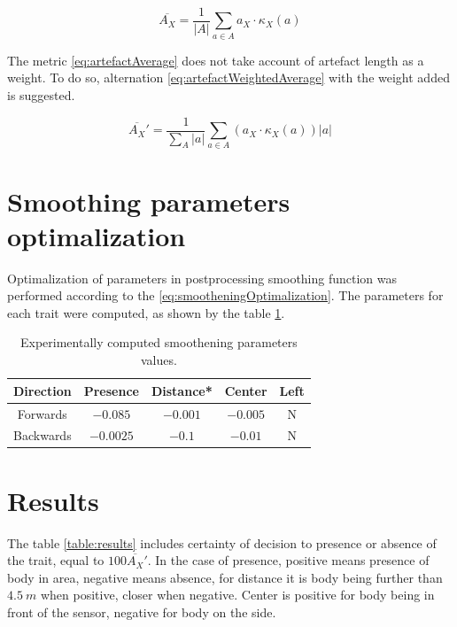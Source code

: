 \begin{equation}
\overline{A_{X}} = \frac{1}{|A|} \sum_{a\in A} a_{X} \cdot \kappa_{X}(a)
\label{eq:artefactAverage}
\end{equation}

The metric \ref{eq:artefactAverage} does not take account of artefact length
as a weight. To do so, alternation \ref{eq:artefactWeightedAverage} with the
weight added is suggested.

\begin{equation}
\overline{A_{X}}' = \frac{1}{\sum_{A}|a|}\sum_{a\in A} (a_{X} \cdot \kappa_{X}(a)) |a|
\label{eq:artefactWeightedAverage}
\end{equation}

\section{Smoothing parameters optimalization}

Optimalization of parameters in postprocessing smoothing function was performed
according to the \ref{eq:smootheningOptimalization}. The parameters for each trait
were computed, as shown by the table \ref{table:smootheningParameters}.

\begin{table}[!ht]
\begin{center}
\begin{tabular}{|c|c c c c|} \hline
\textbf{Direction}  & \textbf{Presence} & \textbf{Distance}*& \textbf{Center} & \textbf{Left} \\ \hline
Forwards            & $-0.085$          & $-0.001$          & $-0.005$        & N             \\
Backwards           & $-0.0025$         & $-0.1$            & $-0.01$         & N             \\ \hline
\end{tabular}
\caption{Experimentally computed smoothening parameters values.\label{table:smootheningParameters} }
\end{center}
\end{table}

\section{Results}

The table \ref{table:results} includes certainty of decision to presence or absence of the trait,
equal to $100\overline{A_{X}}'$. In the case of presence, positive means presence of body in area,
negative means absence, for distance it is body being further than $4.5~m$ when positive, closer when negative.
Center is positive for body being in front of the sensor, negative for body on the side.

